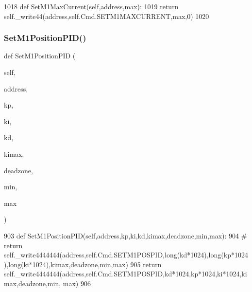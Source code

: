 \begin{DoxyCode}
1018     \textcolor{keyword}{def }SetM1MaxCurrent(self,address,max):
1019         \textcolor{keywordflow}{return} self.\_write44(address,self.Cmd.SETM1MAXCURRENT,max,0)
1020 
\end{DoxyCode}
\mbox{\label{classtoxic__hardware_1_1roboclaw__3_1_1Roboclaw_a86e5bc8af684f784abe72eac70851f3e}} 
\subsubsection{\texorpdfstring{Set\+M1\+Position\+P\+I\+D()}{SetM1PositionPID()}}
{\footnotesize\ttfamily def Set\+M1\+Position\+P\+ID (\begin{DoxyParamCaption}\item[{}]{self,  }\item[{}]{address,  }\item[{}]{kp,  }\item[{}]{ki,  }\item[{}]{kd,  }\item[{}]{kimax,  }\item[{}]{deadzone,  }\item[{}]{min,  }\item[{}]{max }\end{DoxyParamCaption})}


\begin{DoxyCode}
903     \textcolor{keyword}{def }SetM1PositionPID(self,address,kp,ki,kd,kimax,deadzone,min,max):
904 \textcolor{comment}{#       return
       self.\_write4444444(address,self.Cmd.SETM1POSPID,long(kd*1024),long(kp*1024),long(ki*1024),kimax,deadzone,min,max)}
905         \textcolor{keywordflow}{return} self.\_write4444444(address,self.Cmd.SETM1POSPID,kd*1024,kp*1024,ki*1024,kimax,deadzone,min,
      max)
906 
\end{DoxyCode}
\mbox{\label{classtoxic__hardware_1_1roboclaw__3_1_1Roboclaw_a8ea4c0748b43e086bf7326ec1cd1d8f5}} 

